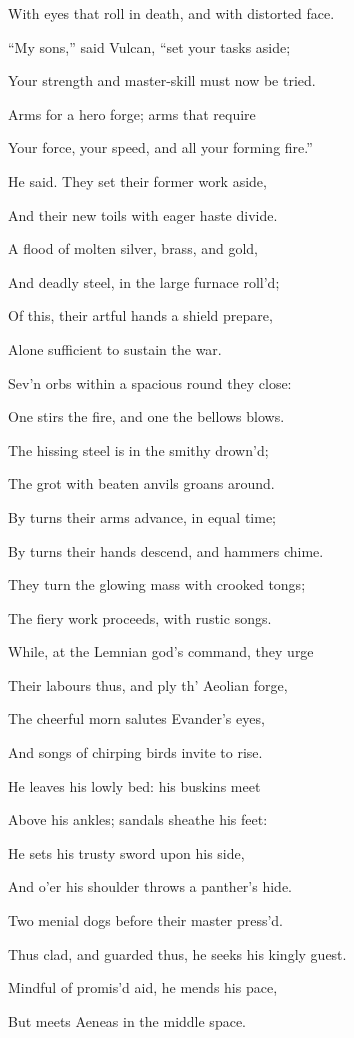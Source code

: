 With eyes that roll in death, and with distorted face.

“My sons,” said Vulcan, “set your tasks aside;

Your strength and master-skill must now be tried.

Arms for a hero forge; arms that require

Your force, your speed, and all your forming fire.”

He said. They set their former work aside,

And their new toils with eager haste divide.

A flood of molten silver, brass, and gold,

And deadly steel, in the large furnace roll’d;

Of this, their artful hands a shield prepare,

Alone sufficient to sustain the war.

Sev’n orbs within a spacious round they close:

One stirs the fire, and one the bellows blows.

The hissing steel is in the smithy drown’d;

The grot with beaten anvils groans around.

By turns their arms advance, in equal time;

By turns their hands descend, and hammers chime.

They turn the glowing mass with crooked tongs;

The fiery work proceeds, with rustic songs.

While, at the Lemnian god’s command, they urge

Their labours thus, and ply th’ Aeolian forge,

The cheerful morn salutes Evander’s eyes,

And songs of chirping birds invite to rise.

He leaves his lowly bed: his buskins meet

Above his ankles; sandals sheathe his feet:

He sets his trusty sword upon his side,

And o’er his shoulder throws a panther’s hide.

Two menial dogs before their master press’d.

Thus clad, and guarded thus, he seeks his kingly guest.

Mindful of promis’d aid, he mends his pace,

But meets Aeneas in the middle space.

